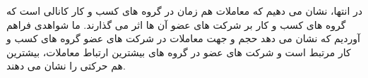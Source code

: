 در انتها، نشان می دهیم که معاملات هم زمان در گروه های کسب و کار کانالی است که گروه های کسب و کار بر شرکت های عضو آن ها اثر می گذارند. ما شواهدی فراهم آوردیم که نشان می دهد حجم و جهت معاملات در شرکت های عضو گروه های کسب و کار مرتبط است و شرکت های عضو در گروه های بیشترین ارتباط معاملات، بیشترین هم حرکتی را نشان می دهند.
%      



